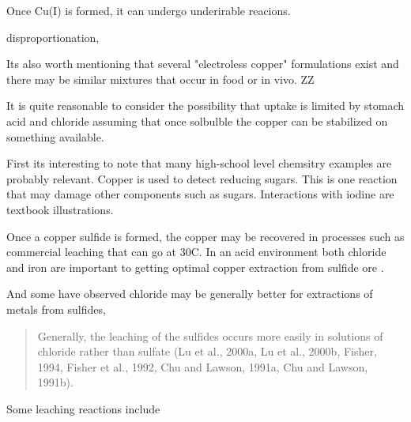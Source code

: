 


Once Cu(I) is formed, it can undergo underirable reacions.

\cite{SAMUNI_ARONOVITCH_GODINGER_cytotoxicity_1983}


disproportionation,


Its also worth mentioning that several "electroless copper"
formulations exist and there may be similar mixtures
that occur in food or in vivo. ZZ


It is quite reasonable to consider the possibility that
uptake is limited by stomach acid and chloride assuming
that once solbulble the copper can be stabilized on something
available. 


First its interesting to note that many high-school
level chemsitry examples are probably relevant. 
Copper is used to detect reducing sugars.
This is one reaction that may damage other components
such as sugars.
Interactions with iodine are textbook illustrations.


Once a copper sulfide is formed, the copper may be recovered
in processes such as commercial leaching that can go at
30C. In an acid environment both chloride and iron 
are important to getting optimal copper extraction from 
sulfide ore 
\cite{Salinas_Herreros_Torres_Leaching_Primary_Copper_2018}.

And some have observed chloride may be generally better
for extractions of metals from sulfides, 
\cite{Herreros_Vinals_Leaching_sulfide_copper_2007}
\begin{quote}
Generally, the leaching of the sulfides occurs more easily in solutions of chloride rather than sulfate (Lu et al., 2000a, Lu et al., 2000b, Fisher, 1994, Fisher et al., 1992, Chu and Lawson, 1991a, Chu and Lawson, 1991b). 
\end{quote}

Some leaching reactions include 
\cite{Schlesinger_King_Sole_Hydrometallurgical_Copper_Extraction_2011}


